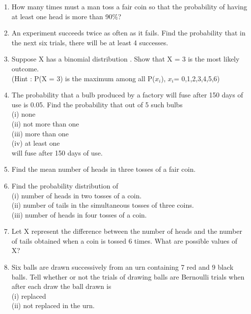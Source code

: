 \renewcommand{\theequation}{\theenumi}
\begin{enumerate}[label=\arabic*.,ref=\thesubsection.\theenumi]


\item How many times must a man toss a fair coin so that the probability of having at least one head is more than 90$\%$?\\
\item An experiment succeeds twice as often as it fails. Find the probability that in the next six trials, there will be at least 4 successes.\\
\item Suppose X has a binomial distribution . Show that X = 3 is the most likely outcome.\\
(Hint : P(X = 3) is the maximum among all P($x_i$), $x_i$= 0,1,2,3,4,5,6)\\
\item The probability that a bulb produced by a factory will fuse after 150 days of use
is 0.05. Find the probability that out of 5 such bulbs\\
(i) none\\
(ii) not more than one\\
(iii) more than one\\
(iv) at least one\\
will fuse after 150 days of use.\\
\item Find the mean number of heads in three tosses of a fair coin.\\

\item Find the probability distribution of\\
(i) number of heads in two tosses of a coin.\\
(ii) number of tails in the simultaneous tosses of three coins.\\
(iii) number of heads in four tosses of a coin.\\
\item Let X represent the difference between the number of heads and the number of tails obtained when a coin is tossed 6 times. What are possible values of X?\\
\item Six balls are drawn successively from an urn containing 7 red and 9 black balls. Tell whether or not the trials of drawing balls are Bernoulli trials when after each draw the ball drawn is\\
(i) replaced \\
(ii) not replaced in the urn.\\


\end{enumerate}
